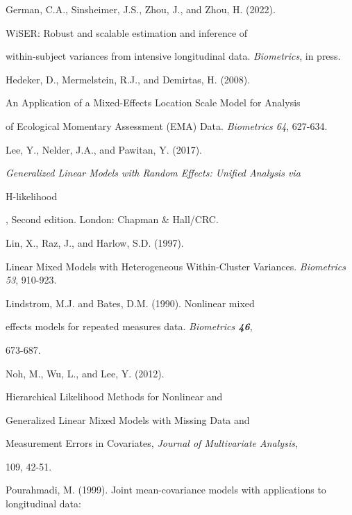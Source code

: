 \documentclass[12pt]{article}
\begin{document}
\begin{description}

\item German, C.A., Sinsheimer, J.S., Zhou, J., and Zhou, H. (2022). 

  WiSER: Robust and scalable estimation and inference of

within-subject variances from intensive longitudinal data. {\it Biometrics}, in press. 



\item Hedeker, D., Mermelstein, R.J., and Demirtas, H. (2008). 

  An Application of a Mixed-Effects Location Scale Model for Analysis

of Ecological Momentary Assessment (EMA) Data. {\it Biometrics 64}, 627-634. 



\item Lee, Y.,  Nelder, J.A., and Pawitan, Y. (2017). 

{\it Generalized Linear Models with Random Effects: Unified Analysis via 

H-likelihood}, Second edition. London: Chapman \& Hall/CRC.  



\item Lin, X., Raz, J., and Harlow, S.D. (1997). 

  Linear Mixed Models with Heterogeneous Within-Cluster Variances. {\it Biometrics 53}, 910-923. 



\item Lindstrom, M.J. and Bates, D.M. (1990).   Nonlinear  mixed

       effects models for repeated measures data. {\it Biometrics {\bf 46}},

       673-687. 



 \item Noh, M., Wu, L., and Lee, Y. (2012).

        Hierarchical Likelihood Methods for Nonlinear and

        Generalized Linear Mixed Models with Missing Data and

        Measurement Errors in Covariates, {\it Journal of Multivariate Analysis},

        109, 42-51. 



\item Pourahmadi, M. (1999). Joint mean-covariance models with applications to longitudinal data:


\end{description}
\end{document}
